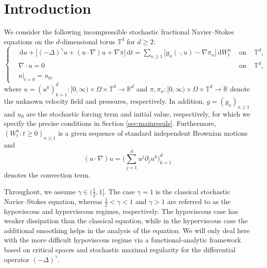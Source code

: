 \documentclass[11pt, a4paper,oneside, reqno]{amsart}
\theoremstyle{remark} %
\theoremstyle{definition} %
\numberwithin{theorem}{section}
\numberwithin{equation}{section}
\def\R{{\mathbb R}}
\newcommand{\T}{\mathbb{T}}
\renewcommand{\d}{\partial}
\newcommand{\del}{\Delta}
\newcommand{\grad}{\nabla}
\newcommand{\gam}{\gamma}
\newcommand{\dd}{\hspace{2pt}\mathrm{d}}
\begin{document}
\section{Introduction}
We consider the following incompressible stochastic fractional Navier--Stokes equations on the $d$-dimensional torus $\T^d$ for $d\geq 2$:
\begin{equation}\label{eq:FSNSE_intro}
\left\{
\begin{aligned}
    &\dd u + \big[(-\del)^\gam u+(u\cdot\grad) u+ \grad \pi\big]\dd t  =\sum_{n\geq 1}\big[g_n(\cdot, u)-\grad \pi_n\big]\dd W^n_t&\text{ on }& \T^d,\\
    &\grad \cdot u = 0&\text{ on }& \T^d,\\
    &u|_{t=0} = u_0,
\end{aligned}
    \right.
\end{equation}
where $u =(u^k)_{k=1}^d:[0,\infty)\times \Omega\times \T^d\to \R^d$ and $\pi, \pi_n: [0,\infty)\times \Omega \times \T^d\to \R$ denote the unknown velocity field and pressures, respectively. In addition, $g=(g_n)_{n\geq 1}$ and $u_0$ are the stochastic forcing term and initial value, respectively, for which we specify the precise conditions in Section \ref{sec:mainresuls}. Furthermore,  $(W^n_t: t\geq 0)_{n\geq 1}$ is a given sequence of standard independent Brownian motions and
\begin{equation}\label{eq:def_convection}
    (u\cdot \grad) u =\big(\sum_{j=1}^d u^j \d_j u^k\big)_{k=1}^d
\end{equation}
denotes the convection term. 


Throughout, we assume $\gam\in (\frac 12, 1]$.  The case $\gam=1$ is the classical stochastic Navier--Stokes equation, whereas
$\frac12<\gam<1$ and $\gam>1$ are referred to as the hypoviscous and hyperviscous regimes, respectively. The hypoviscous case has weaker dissipation than the classical equation, while in the hyperviscous case the additional smoothing helps in the analysis of the equation. We will only deal here with the more difficult hypoviscous regime via a functional-analytic framework based on critical spaces and stochastic maximal regularity for the differential operator $(-\del)^\gam$.
\end{document}
